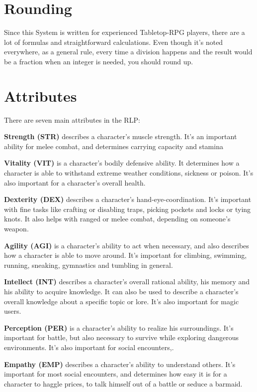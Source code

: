 \section{Rounding}
Since this System is written for experienced Tabletop-RPG players, there are a lot of formulas and straightforward calculations. Even though it’s noted everywhere, as a general rule, every time a division happens and the result would be a fraction when an integer is needed, you should round up.

\section{Attributes}
There are seven main attributes in the RLP:


\textbf{Strength (STR)} describes a character’s muscle strength. It’s an important ability for melee combat, and determines carrying capacity and stamina


\textbf{Vitality (VIT)} is a character’s bodily defensive ability. It determines how a character is able to withstand extreme weather conditions, sickness or poison. It’s also important for a character’s overall health.


\textbf{Dexterity (DEX)} describes a character’s hand-eye-coordination. It’s important with fine tasks like crafting or disabling traps, picking pockets and locks or tying knots. It also helps with ranged or melee combat, depending on someone’s weapon.


\textbf{Agility (AGI)} is a character’s ability to act when necessary, and also describes how a character is able to move around. It’s important for climbing, swimming, running, sneaking, gymnastics and tumbling in general.


\textbf{Intellect (INT)} describes a character’s overall rational ability, his memory and his ability to acquire knowledge. It can also be used to describe a character’s overall knowledge about a specific topic or lore. It’s also important for magic users.


\textbf{Perception (PER)} is a character’s ability to realize his surroundings. It’s important for battle, but also necessary to survive while exploring dangerous environments. It’s also important for social encounters,.


\textbf{Empathy (EMP)} describes a character’s ability to understand others. It’s important for most social encounters, and determines how easy it is for a character to haggle prices, to talk himself out of a battle or seduce a barmaid.


